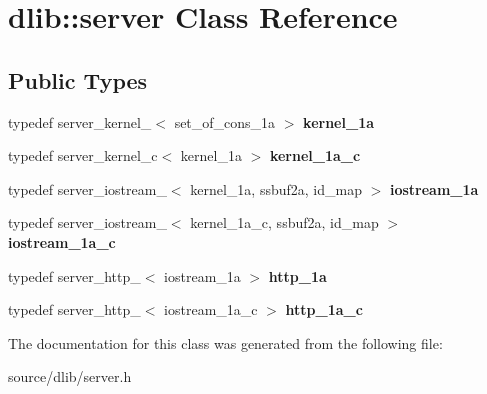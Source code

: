 \hypertarget{classdlib_1_1server}{
\section{dlib::server Class Reference}
\label{classdlib_1_1server}
}
\subsection*{Public Types}
\begin{DoxyCompactItemize}
\item 
\hypertarget{classdlib_1_1server_a4bd238e9bf9a8872f9a3f348f7434344}{
typedef server\_\-kernel\_$<$ set\_\-of\_\-cons\_\-1a $>$ {\bfseries kernel\_\-1a}}
\label{classdlib_1_1server_a4bd238e9bf9a8872f9a3f348f7434344}

\item 
\hypertarget{classdlib_1_1server_aa0957a0f980f36596840efa4d0582b94}{
typedef server\_\-kernel\_\-c$<$ kernel\_\-1a $>$ {\bfseries kernel\_\-1a\_\-c}}
\label{classdlib_1_1server_aa0957a0f980f36596840efa4d0582b94}

\item 
\hypertarget{classdlib_1_1server_ab780fb0c4c7bb9fd75c4d817235213fd}{
typedef server\_\-iostream\_$<$ kernel\_\-1a, ssbuf2a, id\_\-map $>$ {\bfseries iostream\_\-1a}}
\label{classdlib_1_1server_ab780fb0c4c7bb9fd75c4d817235213fd}

\item 
\hypertarget{classdlib_1_1server_a8e1ea89df53d40e008a8098eb6ac5e31}{
typedef server\_\-iostream\_$<$ kernel\_\-1a\_\-c, ssbuf2a, id\_\-map $>$ {\bfseries iostream\_\-1a\_\-c}}
\label{classdlib_1_1server_a8e1ea89df53d40e008a8098eb6ac5e31}

\item 
\hypertarget{classdlib_1_1server_a20d7894b5378057da89982af5569f4cb}{
typedef server\_\-http\_$<$ iostream\_\-1a $>$ {\bfseries http\_\-1a}}
\label{classdlib_1_1server_a20d7894b5378057da89982af5569f4cb}

\item 
\hypertarget{classdlib_1_1server_a712ed8cf8587a73ecd05d3386a817ed8}{
typedef server\_\-http\_$<$ iostream\_\-1a\_\-c $>$ {\bfseries http\_\-1a\_\-c}}
\label{classdlib_1_1server_a712ed8cf8587a73ecd05d3386a817ed8}

\end{DoxyCompactItemize}


The documentation for this class was generated from the following file:\begin{DoxyCompactItemize}
\item 
source/dlib/server.h\end{DoxyCompactItemize}

